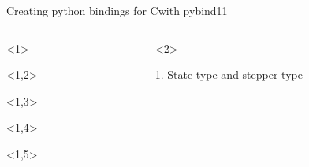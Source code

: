 \documentclass[@BEAMER_OPTIONS@]{beamer}
\newcommand{\CXX}{{\rm C}\plusplus}
\begin{document}
\begin{frame}[fragile]{Creating python bindings for \CXX with pybind11}
    \vspace{-0.5\baselineskip}
    \begin{columns}
        \begin{column}[c]{0.3\textwidth}
            \begin{exampleblock}{}
                \begin{adjustbox}{width=0.28\textwidth, height=\textheight, keepaspectratio}
                    \begin{minipage}{\textwidth}
                        \begin{uncoverenv}<1>
                            
                        \end{uncoverenv}
                        \begin{uncoverenv}<1,2>
                            
                        \end{uncoverenv}
                        \begin{uncoverenv}<1,3>
                            
                        \end{uncoverenv}
                        \begin{uncoverenv}<1,4>
                            
                        \end{uncoverenv}
                        \begin{uncoverenv}<1,5>
                            
                        \end{uncoverenv}
                    \end{minipage}
                \end{adjustbox}
            \end{exampleblock}
        \end{column}
        \begin{column}[c]{0.6\textwidth}
            \begin{onlyenv}<2>
                \begin{exampleblock}{1. State type and stepper type}

\end{exampleblock}
\end{onlyenv}
\end{column}
\end{columns}
\end{frame}
\end{document}
